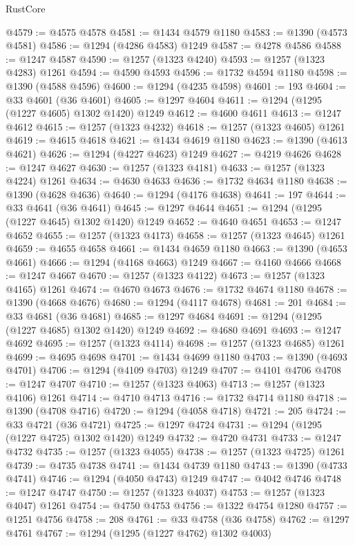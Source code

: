 \begin{lexlean}{RustCore}
\begin{coremodule}
@4579 := @4575 @4578
@4581 := @1434 @4579 @1180
@4583 := @1390 (@4573 @4581)
@4586 := @1294 (@4286 @4583) @1249
@4587 := @4278 @4586
@4588 := @1247 @4587
@4590 := @1257 (@1323 @4240)
@4593 := @1257 (@1323 @4283) @1261
@4594 := @4590 @4593
@4596 := @1732 @4594 @1180
@4598 := @1390 (@4588 @4596)
@4600 := @1294 (@4235 @4598)
@4601 := 193
@4604 := @33 @4601 (@36 @4601)
@4605 := @1297 @4604
@4611 := @1294 (@1295 (@1227 @4605) @1302 @1420) @1249
@4612 := @4600 @4611
@4613 := @1247 @4612
@4615 := @1257 (@1323 @4232)
@4618 := @1257 (@1323 @4605) @1261
@4619 := @4615 @4618
@4621 := @1434 @4619 @1180
@4623 := @1390 (@4613 @4621)
@4626 := @1294 (@4227 @4623) @1249
@4627 := @4219 @4626
@4628 := @1247 @4627
@4630 := @1257 (@1323 @4181)
@4633 := @1257 (@1323 @4224) @1261
@4634 := @4630 @4633
@4636 := @1732 @4634 @1180
@4638 := @1390 (@4628 @4636)
@4640 := @1294 (@4176 @4638)
@4641 := 197
@4644 := @33 @4641 (@36 @4641)
@4645 := @1297 @4644
@4651 := @1294 (@1295 (@1227 @4645) @1302 @1420) @1249
@4652 := @4640 @4651
@4653 := @1247 @4652
@4655 := @1257 (@1323 @4173)
@4658 := @1257 (@1323 @4645) @1261
@4659 := @4655 @4658
@4661 := @1434 @4659 @1180
@4663 := @1390 (@4653 @4661)
@4666 := @1294 (@4168 @4663) @1249
@4667 := @4160 @4666
@4668 := @1247 @4667
@4670 := @1257 (@1323 @4122)
@4673 := @1257 (@1323 @4165) @1261
@4674 := @4670 @4673
@4676 := @1732 @4674 @1180
@4678 := @1390 (@4668 @4676)
@4680 := @1294 (@4117 @4678)
@4681 := 201
@4684 := @33 @4681 (@36 @4681)
@4685 := @1297 @4684
@4691 := @1294 (@1295 (@1227 @4685) @1302 @1420) @1249
@4692 := @4680 @4691
@4693 := @1247 @4692
@4695 := @1257 (@1323 @4114)
@4698 := @1257 (@1323 @4685) @1261
@4699 := @4695 @4698
@4701 := @1434 @4699 @1180
@4703 := @1390 (@4693 @4701)
@4706 := @1294 (@4109 @4703) @1249
@4707 := @4101 @4706
@4708 := @1247 @4707
@4710 := @1257 (@1323 @4063)
@4713 := @1257 (@1323 @4106) @1261
@4714 := @4710 @4713
@4716 := @1732 @4714 @1180
@4718 := @1390 (@4708 @4716)
@4720 := @1294 (@4058 @4718)
@4721 := 205
@4724 := @33 @4721 (@36 @4721)
@4725 := @1297 @4724
@4731 := @1294 (@1295 (@1227 @4725) @1302 @1420) @1249
@4732 := @4720 @4731
@4733 := @1247 @4732
@4735 := @1257 (@1323 @4055)
@4738 := @1257 (@1323 @4725) @1261
@4739 := @4735 @4738
@4741 := @1434 @4739 @1180
@4743 := @1390 (@4733 @4741)
@4746 := @1294 (@4050 @4743) @1249
@4747 := @4042 @4746
@4748 := @1247 @4747
@4750 := @1257 (@1323 @4037)
@4753 := @1257 (@1323 @4047) @1261
@4754 := @4750 @4753
@4756 := @1322 @4754 @1280
@4757 := @1251 @4756
@4758 := 208
@4761 := @33 @4758 (@36 @4758)
@4762 := @1297 @4761
@4767 := @1294 (@1295 (@1227 @4762) @1302 @4003)

\end{coremodule}
\end{lexlean}
